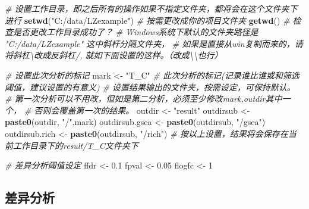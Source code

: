 \documentclass[
]{book}
\newenvironment{Shaded}{\begin{snugshade}}{\end{snugshade}}
\newcommand{\CommentTok}[1]{\textcolor[rgb]{0.56,0.35,0.01}{\textit{#1}}}
\newcommand{\DecValTok}[1]{\textcolor[rgb]{0.00,0.00,0.81}{#1}}
\newcommand{\FloatTok}[1]{\textcolor[rgb]{0.00,0.00,0.81}{#1}}
\newcommand{\FunctionTok}[1]{\textcolor[rgb]{0.13,0.29,0.53}{\textbf{#1}}}
\newcommand{\NormalTok}[1]{#1}
\newcommand{\OtherTok}[1]{\textcolor[rgb]{0.56,0.35,0.01}{#1}}
\newcommand{\StringTok}[1]{\textcolor[rgb]{0.31,0.60,0.02}{#1}}
\begin{document}
\begin{Shaded}
\begin{Highlighting}[]
\CommentTok{\# 设置工作目录，即之后所有的操作如果不指定文件夹，都将会在这个文件夹下进行}
\FunctionTok{setwd}\NormalTok{(}\StringTok{"C:/data/LZexample"}\NormalTok{)  }\CommentTok{\# 按需更改成你的项目文件夹}
\FunctionTok{getwd}\NormalTok{() }\CommentTok{\# 检查是否更改工作目录成功了？}
\CommentTok{\# Windows系统下默认的文件夹路径是 "C:/data/LZexample" 这中斜杆分隔文件夹，}
\CommentTok{\# 如果是直接从win复制而来的，请将斜杠\textbackslash{}改成反斜杠/, 就如下面设置的这样。（改成\textbackslash{}\textbackslash{}也行）}

\CommentTok{\# 设置此次分析的标记}
\NormalTok{mark }\OtherTok{\textless{}{-}} \StringTok{"T\_C"}  \CommentTok{\# 此次分析的标记(记录谁比谁或和筛选阈值，建议设置的有意义)}
\CommentTok{\# 设置结果输出的文件夹，按需设定，可保持默认。}
\CommentTok{\#  第一次分析可以不用改，但如是第二分析，必须至少修改mark,outdir其中一个，}
\CommentTok{\#  否则会覆盖第一次的结果。}
\NormalTok{outdir }\OtherTok{\textless{}{-}} \StringTok{"result"}  
\NormalTok{outdirsub }\OtherTok{\textless{}{-}} \FunctionTok{paste0}\NormalTok{(outdir, }\StringTok{"/"}\NormalTok{,mark)}
\NormalTok{outdirsub.gsea }\OtherTok{\textless{}{-}} \FunctionTok{paste0}\NormalTok{(outdirsub, }\StringTok{"/gsea"}\NormalTok{)}
\NormalTok{outdirsub.rich }\OtherTok{\textless{}{-}} \FunctionTok{paste0}\NormalTok{(outdirsub, }\StringTok{"/rich"}\NormalTok{)}
\CommentTok{\# 按以上设置，结果将会保存在当前工作目录下的result/T\_C文件夹下}

\CommentTok{\# 差异分析阈值设定}
\NormalTok{ffdr }\OtherTok{\textless{}{-}} \FloatTok{0.1}
\NormalTok{fpval }\OtherTok{\textless{}{-}} \FloatTok{0.05}
\NormalTok{flogfc }\OtherTok{\textless{}{-}} \DecValTok{1}
\end{Highlighting}
\end{Shaded}

\subsection{差异分析}\label{ux5deeux5f02ux5206ux6790}
\end{document}
